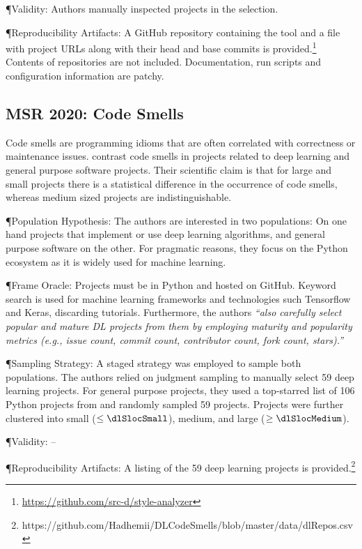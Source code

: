 \documentclass[sigconf,review,anonymous]{acmart}
\newcommand{\gh}{{GitHub}\xspace}
\begin{document}
\P{Validity:} Authors manually inspected projects in the selection.

\P{Reproducibility Artifacts:} A \gh repository containing the tool and a file
with project URLs along with their head and base commits is
provided.\footnote{\url{https://github.com/src-d/style-analyzer}} Contents of
repositories are not included. Documentation, run scripts and configuration
information are patchy.

\subsection{MSR 2020: Code Smells}

Code smells are programming idioms that are often correlated with correctness or
maintenance issues. \citet{Jebnoun:2020:MSR} contrast code smells in projects
related to deep learning and general purpose software projects. Their scientific
claim is that for large and small projects there is a statistical difference in
the occurrence of code smells, whereas medium sized projects are
indistinguishable.

\P{Population Hypothesis:} The authors are interested in two populations: On one
hand projects that implement or use deep learning algorithms, and general
purpose software on the other. For pragmatic reasons, they focus on the Python
ecosystem as it is widely used for machine learning.

\P{Frame Oracle:} Projects must be in Python and hosted on \gh. Keyword
search is used for machine learning frameworks and technologies such Tensorflow and
Keras, discarding tutorials. Furthermore, the authors \textit{``also carefully select
  popular and mature DL projects from them by employing maturity and popularity
  metrics (e.g., issue count, commit count, contributor count, fork count,
  stars).''}

\P{Sampling Strategy:} A staged strategy was employed to sample both
populations. The authors relied on judgment sampling to manually select 59 deep
learning projects. For general purpose projects, they used a top-starred list of
106 Python projects from \citet{Chen:2018:IST} and randomly sampled 59 projects.
Projects were further clustered into small ($\leq\dlSlocSmall$), medium, and
large ($\geq\dlSlocMedium$).

\P{Validity:} --

\P{Reproducibility Artifacts:}  A listing of the 59 deep learning projects is
provided.\footnote{https://github.com/Hadhemii/DLCodeSmells/blob/master/data/dlRepos.csv}
\end{document}
